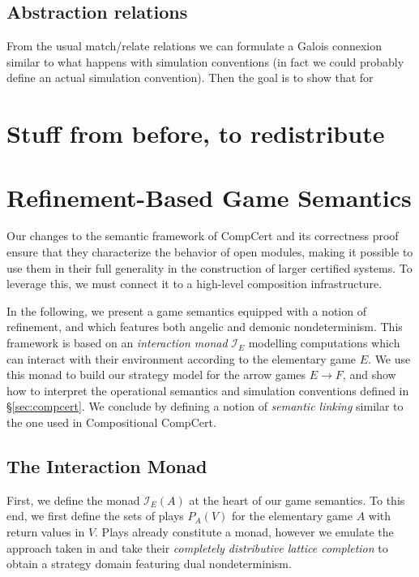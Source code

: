 \documentclass[format=sigplan,authordraft]{acmart}
\begin{document}
\subsection{Abstraction relations} %

From the usual match/relate relations
we can formulate a Galois connexion
similar to what happens with simulation conventions
(in fact we could probably define an actual simulation convention).
Then the goal is to show that for 








\newpage
\appendix
\section*{Stuff from before, to redistribute}

\section{Refinement-Based Game Semantics} \label{sec:gamesem} %

Our changes to the semantic framework of CompCert
and its correctness proof
ensure that they characterize the behavior of open modules,
making it possible to use them in their full generality
in the construction of larger certified systems.
To leverage this,
we must connect it to a high-level composition infrastructure.

In the following,
we present a game semantics equipped with a notion of refinement,
and which features both angelic and demonic nondeterminism.
This framework is based on an \emph{interaction monad} $\mathcal{I}_E$
modelling computations which can interact with their environment
according to the elementary game $E$.
We use this monad to build our strategy model for the
arrow games $E \rightarrow F$,
and show how to interpret the operational semantics
and simulation conventions defined in \S\ref{sec:compcert}.
We conclude by defining a notion of \emph{semantic linking}
similar to the one used in Compositional CompCert.

\subsection{The Interaction Monad} \label{sec:monad:def} %

First,
we define the monad $\mathcal{I}_E(A)$
at the heart of our game semantics.
To this end,
we first define the sets of plays $P_A(V)$
for the elementary game $A$ with return values in $V$.
Plays already constitute a monad,
however we emulate the approach taken in \cite{cspdnd}
and take their \emph{completely distributive lattice completion}
to obtain a strategy domain featuring dual nondeterminism.
\end{document}
